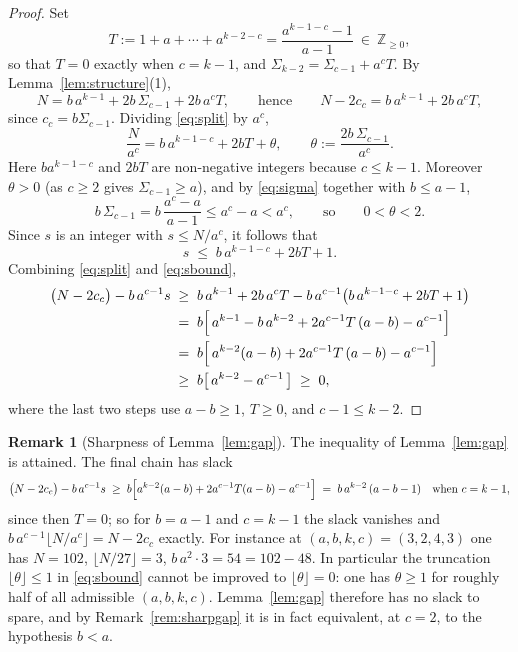 \documentclass{amsart}
\theoremstyle{definition}
\newtheorem{remark}[theorem]{Remark}
\newcommand{\ZZ}{\mathbb{Z}}
\begin{document}
\begin{proof}
Set
\[
  T:=1+a+\cdots+a^{k-2-c}=\frac{a^{k-1-c}-1}{a-1}\ \in\ \ZZ_{\ge0},
\]
so that $T=0$ exactly when $c=k-1$, and
$\Sigma_{k-2}=\Sigma_{c-1}+a^{c}T$.  By
Lemma~\ref{lem:structure}(1),
\begin{equation}\label{eq:split}
  N=b\,a^{k-1}+2b\,\Sigma_{c-1}+2b\,a^{c}T,
  \qquad\text{hence}\qquad
  N-2c_c=b\,a^{k-1}+2b\,a^{c}T,
\end{equation}
since $c_c=b\Sigma_{c-1}$.  Dividing \eqref{eq:split} by $a^c$,
\[
  \frac{N}{a^{c}}=b\,a^{k-1-c}+2bT+\theta,
  \qquad \theta:=\frac{2b\,\Sigma_{c-1}}{a^{c}} .
\]
Here $b a^{k-1-c}$ and $2bT$ are non-negative integers because $c\le k-1$.
Moreover $\theta>0$ (as $c\ge2$ gives $\Sigma_{c-1}\ge a$), and by
\eqref{eq:sigma} together with $b\le a-1$,
\[
  b\,\Sigma_{c-1}=b\,\frac{a^{c}-a}{a-1}\le a^{c}-a<a^{c},
  \qquad\text{so}\qquad 0<\theta<2 .
\]
Since $s$ is an integer with $s\le N/a^{c}$, it follows that
\begin{equation}\label{eq:sbound}
  s\;\le\;b\,a^{k-1-c}+2bT+1 .
\end{equation}
Combining \eqref{eq:split} and \eqref{eq:sbound},
\begin{align*}
  \bigl(N-2c_c\bigr)-b\,a^{c-1}s
  &\;\ge\; b\,a^{k-1}+2b\,a^{c}T
        - b\,a^{c-1}\bigl(b\,a^{k-1-c}+2bT+1\bigr)\\
  &\;=\; b\Bigl[\,a^{k-1}-b\,a^{k-2}
        +2a^{c-1}T\,(a-b)-a^{c-1}\Bigr]\\
  &\;=\; b\Bigl[\,a^{k-2}(a-b)+2a^{c-1}T\,(a-b)-a^{c-1}\Bigr]\\
  &\;\ge\; b\bigl[\,a^{k-2}-a^{c-1}\,\bigr]\;\ge\;0 ,
\end{align*}
where the last two steps use $a-b\ge1$, $T\ge0$, and $c-1\le k-2$.
\end{proof}

\begin{remark}[Sharpness of Lemma~\ref{lem:gap}]\label{rem:gaptight}
The inequality of Lemma~\ref{lem:gap} is attained.  The final chain has slack
\[
  \bigl(N-2c_c\bigr)-b\,a^{c-1}s\;\ge\;
  b\Bigl[a^{k-2}(a-b)+2a^{c-1}T(a-b)-a^{c-1}\Bigr]
  \;=\;b\,a^{k-2}\,(a-b-1)\quad\text{when }c=k-1,
\]
since then $T=0$; so for $b=a-1$ and $c=k-1$ the slack vanishes and
$b\,a^{c-1}\lfloor N/a^{c}\rfloor=N-2c_c$ exactly.  For instance at
$(a,b,k,c)=(3,2,4,3)$ one has $N=102$, $\lfloor N/27\rfloor=3$,
$b\,a^{2}\cdot3=54=102-48$.  In particular the truncation
$\lfloor\theta\rfloor\le1$ in \eqref{eq:sbound} cannot be improved to
$\lfloor\theta\rfloor=0$: one has $\theta\ge1$ for roughly half of all
admissible $(a,b,k,c)$.  Lemma~\ref{lem:gap} therefore has no slack to spare,
and by Remark~\ref{rem:sharpgap} it is in fact equivalent, at $c=2$, to the
hypothesis $b<a$.
\end{remark}
\end{document}

